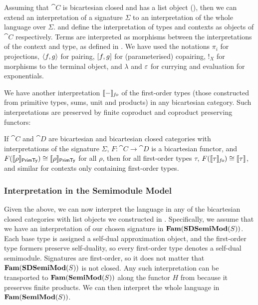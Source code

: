 Assuming that $\cat{C}$ is bicartesian closed and has a list object (), then we can extend an
interpretation of a signature $\Sigma$ to an interpretation of the whole language over
$\Sigma$.  and  define the interpretation of types and
contexts as objects of $\cat{C}$ respectively. Terms are interpreted as morphisms between the interpretations
of the context and type, as defined in . We have used the notations $\pi_i$ for
projections, $\langle f, g\rangle$ for pairing, $[f, g]$ for (parameterised) copairing, $!_X$ for morphisms
to the terminal object, and $\lambda$ and $\varepsilon$ for currying and evaluation for exponentials.

We have another interpretation $\llbracket - \rrbracket_{\mathit{fo}}$ of the
first-order types (those constructed from primitive types, sums, unit
and products) in any bicartesian category. Such interpretations are
preserved by finite coproduct and coproduct preserving functors:

\begin{lemma}\label{lem:first-order-agreement-types}
  If $\cat{C}$ and $\cat{D}$ are bicartesian and bicartesian closed categories with interpretations of the
  signature $\Sigma$, $F : \cat{C} \to \cat{D}$ is a bicartesian functor, and
  $F(\llbracket \rho \rrbracket_{\mathsf{PrimTy}}) \cong \llbracket \rho \rrbracket_{\mathsf{PrimTy}}$ for all $\rho$, then for all first-order types $\tau$,
  $F(\llbracket \tau \rrbracket_{\mathit{fo}}) \cong \llbracket \tau \rrbracket$, and similar for contexts only containing first-order types.
\end{lemma}

\subsubsection{Interpretation in the Semimodule Model}
\label{sec:language:gps-interpretation}

Given the above, we can now interpret the language in any of the bicartesian closed categories with list
objects we constructed in . Specifically, we assume that we have an interpretation
of our chosen signature in $\mathbf{Fam}(\mathbf{SDSemiMod}(S))$. Each base type is
assigned a self-dual approximation object, and the first-order type formers preserve self-duality, so every
first-order type denotes a self-dual semimodule. Signatures are
first-order, so it does not matter that $\mathbf{Fam}(\mathbf{SDSemiMod}(S))$ is not closed. Any
such interpretation can be transported to $\mathbf{Fam}(\mathbf{SemiMod}(S))$ along the functor $H$ from  because it preserves finite products. We
can then interpret the whole language in $\mathbf{Fam}(\mathbf{SemiMod}(S))$.

